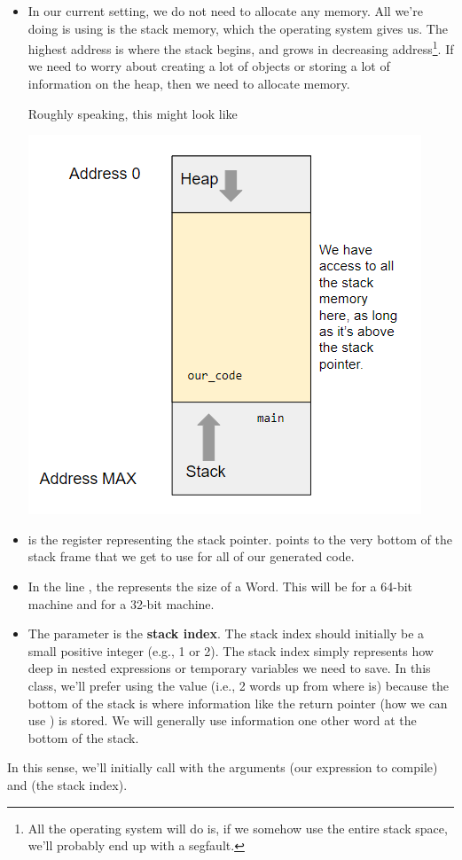 \begin{itemize}
    \item In our current setting, we do not need to allocate any memory. All we're doing is using is the stack memory, which the operating system gives us. The highest address is where the stack begins, and grows in decreasing address\footnote{All the operating system will do is, if we somehow use the entire stack space, we'll probably end up with a segfault.}. If we need to worry about creating a lot of objects or storing a lot of information on the heap, then we need to allocate memory. 
    
    \bigskip 

    Roughly speaking, this might look like 
    \begin{center}
        \includegraphics[scale=0.9]{assets/stack_vis.png}
    \end{center}
    \item {} is the register representing the stack pointer.  points to the very bottom of the stack frame that we get to use for all of our generated code. 
    \item In the line , the  represents the size of a Word. This will be  for a 64-bit machine and  for a 32-bit machine. 
    \item The  parameter is the \textbf{stack index}. The stack index should initially be a small positive integer (e.g., 1 or 2). The stack index simply represents how deep in nested expressions or temporary variables we need to save. In this class, we'll prefer using the value  (i.e., 2 words up from where  is) because the bottom of the stack is where information like the return pointer (how we can use ) is stored. We will generally use information one other word at the bottom of the stack.
\end{itemize}
In this sense, we'll initially call  with the arguments  (our expression to compile) and  (the stack index).

